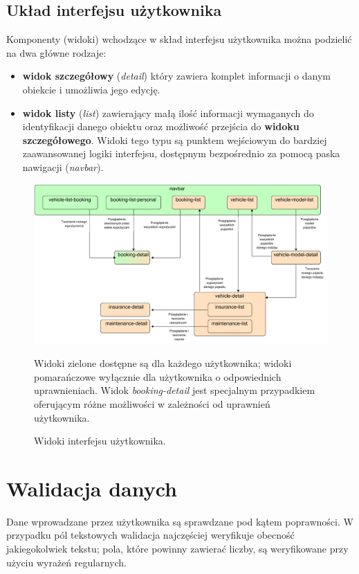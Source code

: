 \documentclass[eng,printmode,openany]{mgr}
\begin{document}
	\subsection{Układ interfejsu użytkownika}
	Komponenty (widoki) wchodzące w skład interfejsu użytkownika można podzielić na dwa główne rodzaje:
	\begin{itemize}
		\item \textbf{widok szczegółowy} (\textit{detail}) który zawiera komplet informacji o danym obiekcie i umożliwia jego edycję.
		\item \textbf{widok listy} (\textit{list}) zawierający małą ilość informacji wymaganych do identyfikacji danego obiektu oraz możliwość przejścia do \textbf{widoku szczegółowego}. Widoki tego typu są punktem wejściowym do bardziej zaawansowanej logiki interfejsu, dostępnym bezpośrednio za pomocą paska nawigacji (\textit{navbar}).
	\end{itemize}
	\begin{figure}[H]
		\centering
		\includegraphics[width=\textwidth]{images/angular_views.png}
		\caption{Widoki interfejsu użytkownika.}
		\small 
		Widoki zielone dostępne są dla każdego użytkownika; widoki pomarańczowe wyłącznie dla użytkownika o odpowiednich uprawnieniach. Widok \textit{booking-detail} jest specjalnym przypadkiem oferującym różne możliwości w zależności od uprawnień użytkownika.
	\end{figure}

	\section{Walidacja danych}
	Dane wprowadzane przez użytkownika są sprawdzane pod kątem poprawności. W przypadku pól tekstowych walidacja najczęściej weryfikuje obecność jakiegokolwiek tekstu; pola, które powinny zawierać liczby, są weryfikowane przy użyciu wyrażeń regularnych.
	
\end{document}

